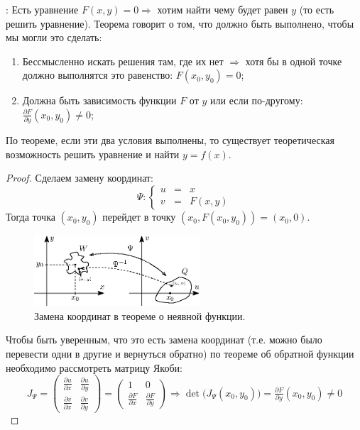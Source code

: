 \documentclass[12pt]{article}
\theoremstyle{definition}
\begin{document}
\textbf{}: Есть уравнение $F(x,y) = 0 \Rightarrow$ хотим найти чему будет равен $y$ (то есть решить уравнение). Теорема говорит о том, что должно быть выполнено, чтобы мы могли это сделать:
\begin{enumerate}[label ={\arabic*)}]
	\item Бессмысленно искать решения там, где их нет $\Rightarrow$ хотя бы в одной точке должно выполнятся это равенство: $F(x_0,y_0) = 0$;
	\item Должна быть зависимость функции $F$ от $y$ или если по-другому: $\tfrac{\partial F}{\partial y}(x_0,y_0) \neq 0$;
\end{enumerate}
По теореме, если эти два условия выполнены, то существует теоретическая возможность решить уравнение и найти $y = f(x)$.
\begin{proof}
	Сделаем замену координат:
	$$
		\Psi \colon \left\{
		\begin{array}{lcl}
			u& = &x \\
			v& = &F(x,y)
		\end{array}\right.
	$$
	Тогда точка $(x_0,y_0)$ перейдет в точку $(x_0, F(x_0,y_0)) = (x_0,0)$. 
	\begin{figure}[H]
		\centering
		\includegraphics[width=0.55\textwidth]{16_3.eps}
		\caption{Замена координат в теореме о неявной функции.}
		\label{16_3}
	\end{figure}
	Чтобы быть уверенным, что это есть замена координат (т.е. можно было перевести одни в другие и вернуться обратно) по теореме об обратной функции необходимо рассмотреть матрицу Якоби:
	$$	
		J_{\Psi} = 
		\begin{pmatrix}
			\tfrac{\partial u}{\partial x} & \tfrac{\partial u}{\partial y}\\
			\tfrac{\partial v}{\partial x} & \tfrac{\partial v}{\partial y}
		\end{pmatrix} =
		\begin{pmatrix}
			1 & 0 \\
			\tfrac{\partial F}{\partial x} & \tfrac{\partial F}{\partial y}
		\end{pmatrix}
		\Rightarrow \det{\big(J_\Psi(x_0,y_0)\big)} = \tfrac{\partial F}{\partial y}(x_0,y_0) \neq 0
$$
\end{proof}
\end{document}
